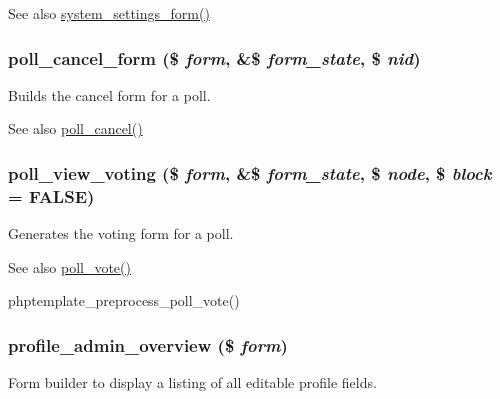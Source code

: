 \begin{DoxySeeAlso}{See also}
\hyperlink{group__forms_ga6fb270d34465d846cd4659a85d3e40c8}{system\_\-settings\_\-form()} 
\end{DoxySeeAlso}
\hypertarget{group__forms_ga15cf9694bfdb20243340a8c7168d441c}{
\subsubsection[{poll\_\-cancel\_\-form}]{\setlength{\rightskip}{0pt plus 5cm}poll\_\-cancel\_\-form (\$ {\em form}, \/  \&\$ {\em form\_\-state}, \/  \$ {\em nid})}}
\label{group__forms_ga15cf9694bfdb20243340a8c7168d441c}
Builds the cancel form for a poll.

\begin{DoxySeeAlso}{See also}
\hyperlink{poll_8module_aa61fb956921bdbfc96b8bc5de349909f}{poll\_\-cancel()} 
\end{DoxySeeAlso}
\hypertarget{group__forms_gace728421201ee0db5c34bfadcf11c4cc}{
\subsubsection[{poll\_\-view\_\-voting}]{\setlength{\rightskip}{0pt plus 5cm}poll\_\-view\_\-voting (\$ {\em form}, \/  \&\$ {\em form\_\-state}, \/  \$ {\em node}, \/  \$ {\em block} = {\ttfamily FALSE})}}
\label{group__forms_gace728421201ee0db5c34bfadcf11c4cc}
Generates the voting form for a poll.

\begin{DoxySeeAlso}{See also}
\hyperlink{poll_8module_a93d35efa34833d1b825d657bc5f26195}{poll\_\-vote()} 

phptemplate\_\-preprocess\_\-poll\_\-vote() 
\end{DoxySeeAlso}
\hypertarget{group__forms_gafea18af3496251513291ed1ddc563fcc}{
\subsubsection[{profile\_\-admin\_\-overview}]{\setlength{\rightskip}{0pt plus 5cm}profile\_\-admin\_\-overview (\$ {\em form})}}
\label{group__forms_gafea18af3496251513291ed1ddc563fcc}
Form builder to display a listing of all editable profile fields.

